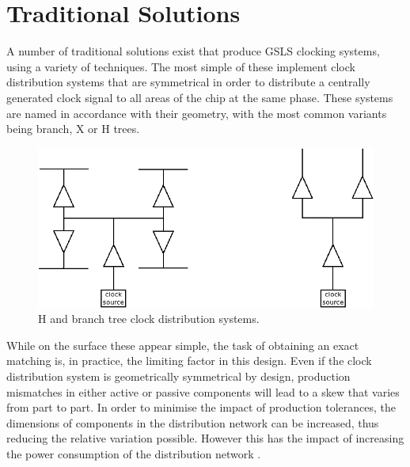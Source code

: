 \section{Traditional Solutions}
A number of traditional solutions exist that produce \ac{GSLS} clocking systems, using a variety of techniques. The most simple of these implement clock distribution systems that are symmetrical in order to distribute a centrally generated clock signal to all areas of the chip at the same phase. These systems are named in accordance with their geometry, with the most common variants being branch, X or H trees. 
\begin{figure}[h]
	\centering
	\includegraphics[scale=0.33]{../trees}
	\caption[H and branch tree clock distribution systems]{H and branch tree clock distribution systems.}
	\label{fig:trees}
\end{figure}

While on the surface these appear simple, the task of obtaining an exact matching is, in practice, the limiting factor in this design. Even if the clock distribution system is geometrically symmetrical by design, production mismatches in either active or passive components will lead to a skew that varies from part to part. In order to minimise the impact of production tolerances, the dimensions of components in the distribution network can be increased, thus reducing the relative variation possible. However this has the impact of increasing the power consumption of the distribution network \cite{tiwari1998reducing}.

